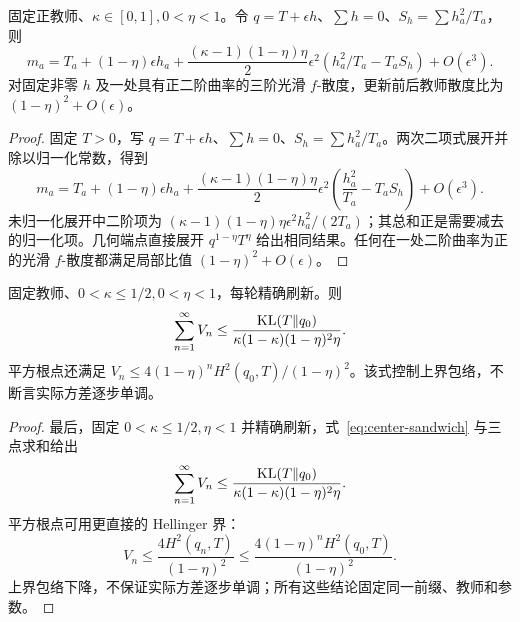 \begin{proposition}[幂均值的二阶展开与共同局部率]
固定正教师、$\kappa\in[0,1],0<\eta<1$。令 $q=T+\epsilon h$、$\sum h=0$、$S_h=\sum h_a^2/T_a$，则
\begin{equation}
m_a=T_a+(1-\eta)\epsilon h_a+
\frac{(\kappa-1)(1-\eta)\eta}{2}\epsilon^2
\left(h_a^2/T_a-T_aS_h\right)+O(\epsilon^3).
\end{equation}
对固定非零 $h$ 及一处具有正二阶曲率的三阶光滑 $f$-散度，更新前后教师散度比为 $(1-\eta)^2+O(\epsilon)$。
\end{proposition}
\begin{proof}
固定 $T>0$，写 $q=T+\epsilon h$、$\sum h=0$、$S_h=\sum h_a^2/T_a$。两次二项式展开并除以归一化常数，得到
\begin{equation}
m_a=T_a+(1-\eta)\epsilon h_a
+\frac{(\kappa-1)(1-\eta)\eta}{2}\epsilon^2
\left(\frac{h_a^2}{T_a}-T_aS_h\right)+O(\epsilon^3).
\end{equation}
未归一化展开中二阶项为 $(\kappa-1)(1-\eta)\eta\epsilon^2h_a^2/(2T_a)$；其总和正是需要减去的归一化项。几何端点直接展开 $q^{1-\eta}T^\eta$ 给出相同结果。任何在一处二阶曲率为正的光滑 $f$-散度都满足局部比值 $(1-\eta)^2+O(\epsilon)$。
\end{proof}

\begin{corollary}[精确外层的监督噪声可求和性]
固定教师、$0<\kappa\le1/2,0<\eta<1$，每轮精确刷新。则
\begin{equation}
\sum_{n=1}^\infty V_n\le
\frac{\operatorname{KL}(T\Vert q_0)}{\kappa(1-\kappa)(1-\eta)^2\eta}.
\end{equation}
平方根点还满足 $V_n\le4(1-\eta)^nH^2(q_0,T)/(1-\eta)^2$。该式控制上界包络，不断言实际方差逐步单调。
\end{corollary}
\begin{proof}
最后，固定 $0<\kappa\le1/2,\eta<1$ 并精确刷新，式~\eqref{eq:center-sandwich} 与三点求和给出
\begin{equation}
\sum_{n=1}^\infty V_n
\le\frac{\operatorname{KL}(T\Vert q_0)}{\kappa(1-\kappa)(1-\eta)^2\eta}.
\end{equation}
平方根点可用更直接的 Hellinger 界：
\begin{equation}
V_n\le\frac{4H^2(q_n,T)}{(1-\eta)^2}
\le\frac{4(1-\eta)^nH^2(q_0,T)}{(1-\eta)^2}.
\end{equation}
上界包络下降，不保证实际方差逐步单调；所有这些结论固定同一前缀、教师和参数。
\end{proof}



